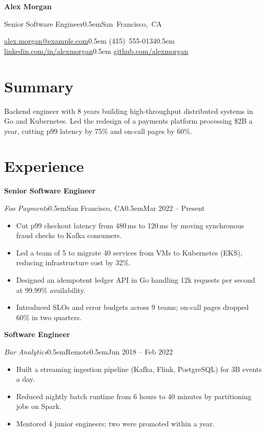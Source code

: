 \documentclass[11pt]{article}
\newcommand{\sep}{\unskip\kern0.5em\textbar\hspace{0.5em}}
\newcommand{\role}[4]{%
  \textbf{#1}\par
  \textit{#3}\sep #4\sep #2\par}
\begin{document}
\begin{center}
  {\fontsize{22}{26}\selectfont\bfseries Alex Morgan}\par\vspace{3pt}
  Senior Software Engineer\sep \mbox{San Francisco, CA}\par\vspace{2pt}
  \mbox{\href{mailto:alex.morgan@example.com}{alex.morgan@example.com}}\sep
  \mbox{(415) 555-0134}\sep
  \mbox{\href{https://linkedin.com/in/alexmorgan}{linkedin.com/in/alexmorgan}}\sep
  \mbox{\href{https://github.com/alexmorgan}{github.com/alexmorgan}}
\end{center}

\section{Summary}
Backend engineer with 8 years building high-throughput distributed systems in Go and Kubernetes.
Led the redesign of a payments platform processing \$2B a year, cutting p99 latency by 75\% and
on-call pages by 60\%.

\section{Experience}
\role{Senior Software Engineer}{Mar 2022 -- Present}{Foo Payments}{San Francisco, CA}
\begin{itemize}
  \item Cut p99 checkout latency from 480\,ms to 120\,ms by moving synchronous fraud checks to Kafka consumers.
  \item Led a team of 5 to migrate 40 services from VMs to Kubernetes (EKS), reducing infrastructure cost by 32\%.
  \item Designed an idempotent ledger API in Go handling 12k requests per second at 99.99\% availability.
  \item Introduced SLOs and error budgets across 9 teams; on-call pages dropped 60\% in two quarters.
\end{itemize}

\vspace{4pt}
\role{Software Engineer}{Jun 2018 -- Feb 2022}{Bar Analytics}{Remote}
\begin{itemize}
  \item Built a streaming ingestion pipeline (Kafka, Flink, PostgreSQL) for 3B events a day.
  \item Reduced nightly batch runtime from 6 hours to 40 minutes by partitioning jobs on Spark.
  \item Mentored 4 junior engineers; two were promoted within a year.
\end{itemize}
\end{document}
